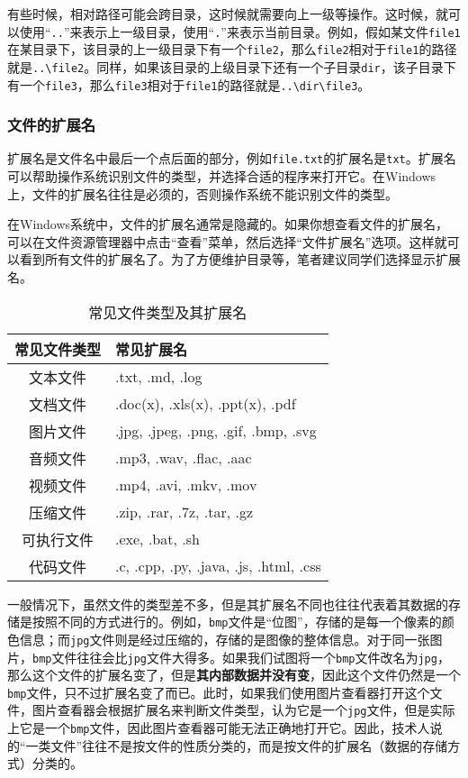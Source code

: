 有些时候，相对路径可能会跨目录，这时候就需要向上一级等操作。这时候，就可以使用“\texttt{..}”来表示上一级目录，使用“\texttt{.}”来表示当前目录。例如，假如某文件\texttt{file1}在某目录下，该目录的上一级目录下有一个\texttt{file2}，那么\texttt{file2}相对于\texttt{file1}的路径就是\texttt{..\textbackslash file2}。同样，如果该目录的上级目录下还有一个子目录\texttt{dir}，该子目录下有一个\texttt{file3}，那么\texttt{file3}相对于\texttt{file1}的路径就是\texttt{..\textbackslash dir\textbackslash file3}。

\subsubsection{文件的扩展名}

扩展名是文件名中最后一个点后面的部分，例如\texttt{file.txt}的扩展名是\texttt{txt}。扩展名可以帮助操作系统识别文件的类型，并选择合适的程序来打开它。在Windows上，文件的扩展名往往是必须的，否则操作系统不能识别文件的类型。

在Windows系统中，文件的扩展名通常是隐藏的。如果你想查看文件的扩展名，可以在文件资源管理器中点击“查看”菜单，然后选择“文件扩展名”选项。这样就可以看到所有文件的扩展名了。为了方便维护目录等，笔者建议同学们选择显示扩展名。

\begin{table}[ht]
  \centering
  \begin{tabular}{c|l}
    \toprule
    常见文件类型 & 常见扩展名 \\
    \midrule
    文本文件 & .txt, .md, .log \\
    文档文件 & .doc(x), .xls(x), .ppt(x), .pdf \\
    图片文件 & .jpg, .jpeg, .png, .gif, .bmp, .svg \\
    音频文件 & .mp3, .wav, .flac, .aac \\
    视频文件 & .mp4, .avi, .mkv, .mov \\
    压缩文件 & .zip, .rar, .7z, .tar, .gz \\
    可执行文件 & .exe, .bat, .sh \\
    代码文件 & .c, .cpp, .py, .java, .js, .html, .css \\
    \bottomrule
  \end{tabular}
  \caption{常见文件类型及其扩展名}
  \label{tab:file-extensions}
\end{table}

一般情况下，虽然文件的类型差不多，但是其扩展名不同也往往代表着其数据的存储是按照不同的方式进行的。例如，\texttt{bmp}文件是“位图”，存储的是每一个像素的颜色信息；而\texttt{jpg}文件则是经过压缩的，存储的是图像的整体信息。对于同一张图片，\texttt{bmp}文件往往会比\texttt{jpg}文件大得多。如果我们试图将一个\texttt{bmp}文件改名为\texttt{jpg}，那么这个文件的扩展名变了，但是\textbf{其内部数据并没有变}，因此这个文件仍然是一个\texttt{bmp}文件，只不过扩展名变了而已。此时，如果我们使用图片查看器打开这个文件，图片查看器会根据扩展名来判断文件类型，认为它是一个\texttt{jpg}文件，但是实际上它是一个\texttt{bmp}文件，因此图片查看器可能无法正确地打开它。因此，技术人说的“一类文件”往往不是按文件的性质分类的，而是按文件的扩展名（数据的存储方式）分类的。

